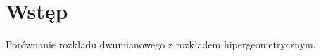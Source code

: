 \documentclass[twoside,a4paper]{book}
\begin{document}
	
\chapter{Wstęp}
Porównanie rozkładu dwumianowego z rozkładem hipergeometrycznym.
\end{document}
